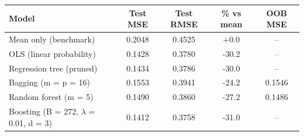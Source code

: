 \begin{tabular}{lcccc}
\hline
Model & Test MSE & Test RMSE & \% vs mean & OOB MSE \\
\hline
Mean only (benchmark) & 0.2048 & 0.4525 & +0.0 & -- \\
OLS (linear probability) & 0.1428 & 0.3780 & -30.2 & -- \\
Regression tree (pruned) & 0.1434 & 0.3786 & -30.0 & -- \\
Bagging (m = p = 16) & 0.1553 & 0.3941 & -24.2 & 0.1546 \\
Random forest (m = 5) & 0.1490 & 0.3860 & -27.2 & 0.1486 \\
Boosting (B = 272, $\lambda$ = 0.01, d = 3) & 0.1412 & 0.3758 & -31.0 & -- \\
\hline
\end{tabular}
